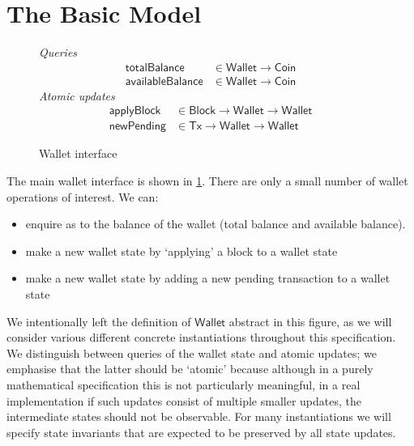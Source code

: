 \documentclass{article}
\theoremstyle{definition}{
  \newtheorem{lemma}{Lemma}[section] %
  \newtheorem{definition}[lemma]{Definition}
}
\theoremstyle{theorem}{
  \newtheorem{invariant}[lemma]{Invariant}
  \newtheorem{proofobligation}[lemma]{Proof Obligation}
}
\numberwithin{equation}{lemma}
\begin{document}
\section{The Basic Model}
\label{sec:wallet_operations}

\begin{figure}
%
\emph{Queries}
%
\begin{align*}
  \mathsf{totalBalance}
& \in \mathsf{Wallet} \to \mathsf{Coin}
\\
  \mathsf{availableBalance}
& \in \mathsf{Wallet} \to \mathsf{Coin}
\end{align*}
%
\emph{Atomic updates}
%
\begin{align*}
  \mathsf{applyBlock}
& \in \mathsf{Block} \to \mathsf{Wallet} \to \mathsf{Wallet}
\\
  \mathsf{newPending}
& \in \mathsf{Tx} \to \mathsf{Wallet} \to \mathsf{Wallet}
\end{align*}

\caption{\label{fig:wallet_interface}Wallet interface}
\end{figure}

The main wallet interface is shown in \cref{fig:wallet_interface}. There
are only a small number of wallet operations of interest. We can:
%
\begin{itemize}
\item enquire as to the balance of the wallet (total balance and
      available balance).
\item make a new wallet state by `applying' a block to a wallet state
\item make a new wallet state by adding a new pending transaction to a wallet
      state
\end{itemize}
%
We intentionally left the definition of $\mathsf{Wallet}$ abstract in this
figure, as we will consider various different concrete instantiations throughout
this specification. We distinguish between queries of the wallet state
and atomic updates; we emphasise that the latter should be `atomic' because
although in a purely mathematical specification this is not particularly
meaningful, in a real implementation if such updates consist of multiple
smaller updates, the intermediate states should not be observable. For many
instantiations we will specify state invariants that are expected to be
preserved by all state updates.
\end{document}
